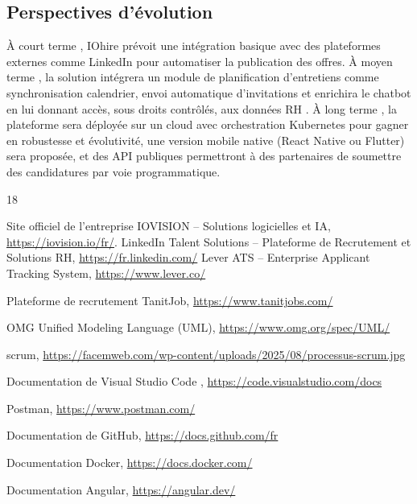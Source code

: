 \documentclass[12pt,a4paper,oneside]{report}
\begin{document}
\begin{itemize}
\subsection*{Perspectives d’évolution}

À court terme , IOhire prévoit une intégration basique avec des plateformes externes comme LinkedIn pour automatiser la publication des offres. À moyen terme , la solution intégrera un module de planification d’entretiens comme synchronisation calendrier, envoi automatique d’invitations et enrichira le chatbot en lui donnant accès, sous droits contrôlés, aux données RH . À long terme , la plateforme sera déployée sur un cloud avec orchestration Kubernetes pour gagner en robustesse et évolutivité, une version mobile native (React Native ou Flutter) sera proposée, et des API publiques permettront à des partenaires de soumettre des candidatures par voie programmatique.


\begin{thebibliography}{18}

 Site officiel de l'entreprise IOVISION -- Solutions logicielles et IA, \url{https://iovision.io/fr/}.
 LinkedIn Talent Solutions -- Plateforme de Recrutement et Solutions RH, \url{https://fr.linkedin.com/}
 Lever ATS -- Enterprise Applicant Tracking System, \url{https://www.lever.co/}

 Plateforme de recrutement TanitJob, \url{https://www.tanitjobs.com/}

 OMG Unified Modeling Language (UML), \url{https://www.omg.org/spec/UML/}

 scrum, \url{https://facemweb.com/wp-content/uploads/2025/08/processus-scrum.jpg}

Documentation de Visual Studio Code , \url{https://code.visualstudio.com/docs}

 Postman, \url{https://www.postman.com/}

 Documentation de GitHub, \url{https://docs.github.com/fr}

 Documentation Docker, \url{https://docs.docker.com/}

 Documentation Angular, \url{https://angular.dev/}


\end{thebibliography}
\end{itemize}
\end{document}
